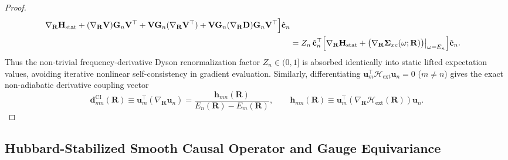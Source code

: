 \documentclass[10pt]{article}
\theoremstyle{natthm}
\newcommand{\Hext}{\mathcal{H}_{\mathrm{ext}}}
\begin{document}
\begin{proof}
\begin{align}
       \nabla_{\mathbf{R}}\mathbf{H}_{\mathrm{stat}}
     + (\nabla_{\mathbf{R}}\mathbf{V})\mathbf{G}_n\mathbf{V}^\top
     + \mathbf{V}\mathbf{G}_n(\nabla_{\mathbf{R}}\mathbf{V}^\top)
     + \mathbf{V}\mathbf{G}_n(\nabla_{\mathbf{R}}\mathbf{D})\mathbf{G}_n\mathbf{V}^\top
     \Bigr]\hat{\mathbf{c}}_n \nonumber \\
  &= Z_n\,\hat{\mathbf{c}}_n^\top \Bigl[\nabla_{\mathbf{R}}\mathbf{H}_{\mathrm{stat}}
     + \bigl(\nabla_{\mathbf{R}}\mathbf{\Sigma}_{xc}(\omega; \mathbf{R})\bigr)\big|_{\omega=E_n}\Bigr]\hat{\mathbf{c}}_n.
\end{align}
Thus the non-trivial frequency-derivative Dyson renormalization factor $Z_n \in (0, 1]$ is absorbed identically into static lifted expectation values, avoiding iterative nonlinear self-consistency in gradient evaluation.
Similarly, differentiating $\mathbf{u}_m^\top\Hext\mathbf{u}_n = 0$ ($m\ne n$) gives the exact non-adiabatic derivative coupling vector
\begin{equation}
  \mathbf{d}_{mn}^{\mathrm{CI}}(\mathbf{R})
  \equiv \mathbf{u}_m^\top (\nabla_{\mathbf{R}}\mathbf{u}_n)
  = \frac{\mathbf{h}_{mn}(\mathbf{R})}{E_n(\mathbf{R}) - E_m(\mathbf{R})}, \qquad
  \mathbf{h}_{mn}(\mathbf{R}) \equiv \mathbf{u}_m^\top (\nabla_{\mathbf{R}}\Hext(\mathbf{R}))\mathbf{u}_n.
\end{equation}
\end{proof}

\subsection{Hubbard-Stabilized Smooth Causal Operator and Gauge Equivariance}
\end{document}
